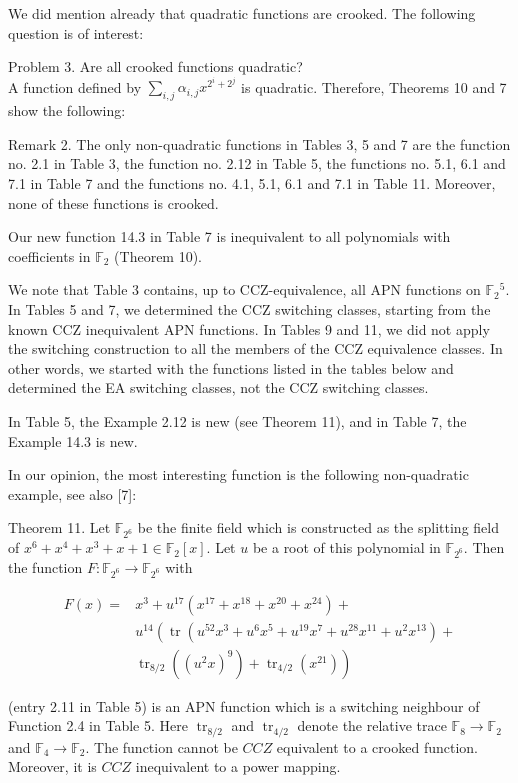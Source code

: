 \documentclass[10pt]{article}
\begin{document}
We did mention already that quadratic functions are crooked. The following question is of interest:

Problem 3. Are all crooked functions quadratic?\\
A function defined by $\sum_{i, j} \alpha_{i, j} x^{2^{i}+2^{j}}$ is quadratic. Therefore, Theorems 10 and 7 show the following:

Remark 2. The only non-quadratic functions in Tables 3, 5 and 7 are the function no. 2.1 in Table 3, the function no. 2.12 in Table 5, the functions no. 5.1, 6.1 and 7.1 in Table 7 and the functions no. 4.1, 5.1, 6.1 and 7.1 in Table 11. Moreover, none of these functions is crooked.

Our new function 14.3 in Table 7 is inequivalent to all polynomials with coefficients in $\mathbb{F}_{2}$ (Theorem 10).

We note that Table 3 contains, up to CCZ-equivalence, all APN functions on $\mathbb{F}_{2}{ }^{5}$. In Tables 5 and 7, we determined the CCZ switching classes, starting from the known CCZ inequivalent APN functions. In Tables 9 and 11, we did not apply the switching construction to all the members of the CCZ equivalence classes. In other words, we started with the functions listed in the tables below and determined the EA switching classes, not the CCZ switching classes.

In Table 5, the Example 2.12 is new (see Theorem 11), and in Table 7, the Example 14.3 is new.

In our opinion, the most interesting function is the following non-quadratic example, see also [7]:

Theorem 11. Let $\mathbb{F}_{2^{6}}$ be the finite field which is constructed as the splitting field of $x^{6}+x^{4}+ x^{3}+x+1 \in \mathbb{F}_{2}[x]$. Let $u$ be a root of this polynomial in $\mathbb{F}_{2^{6}}$. Then the function $F: \mathbb{F}_{2^{6}} \rightarrow \mathbb{F}_{2^{6}}$ with


\begin{align*}
F(x)= & x^{3}+u^{17}\left(x^{17}+x^{18}+x^{20}+x^{24}\right)+ \\
& u^{14}\left(\operatorname{tr}\left(u^{52} x^{3}+u^{6} x^{5}+u^{19} x^{7}+u^{28} x^{11}+u^{2} x^{13}\right)+\right.  \tag{9}\\
& \left.\operatorname{tr}_{8 / 2}\left(\left(u^{2} x\right)^{9}\right)+\operatorname{tr}_{4 / 2}\left(x^{21}\right)\right)
\end{align*}


(entry 2.11 in Table 5) is an APN function which is a switching neighbour of Function 2.4 in Table 5. Here $\operatorname{tr}_{8 / 2}$ and $\operatorname{tr}_{4 / 2}$ denote the relative trace $\mathbb{F}_{8} \rightarrow \mathbb{F}_{2}$ and $\mathbb{F}_{4} \rightarrow \mathbb{F}_{2}$. The function cannot be $C C Z$ equivalent to a crooked function. Moreover, it is $C C Z$ inequivalent to a power mapping.
\end{document}
